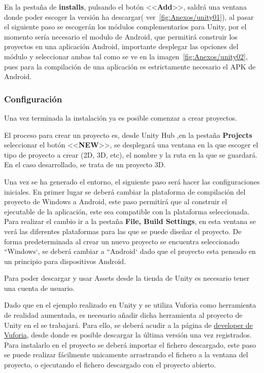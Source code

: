 En la pestaña de \textbf{installs}, pulsando el botón <<\textbf{Add}>>, saldrá una ventana donde poder escoger la versión ha descargar( ver~\ref{fig:Anexos/unity01}), al pasar el siguiente paso se escogerán los módulos complementarios para Unity, por el momento sería necesario el modulo de Android, que permitirá construir los proyectos en una aplicación Android, importante desplegar las opciones del módulo y seleccionar ambas tal como se ve en la imagen~\ref{fig:Anexos/unity02}, pues para la compilación de una aplicación es estrictamente necesario el APK de Android.



\label{sub:Confi}\subsubsection{Configuración }

Una vez terminada la instalación ya es posible comenzar a crear proyectos. 

El proceso para crear un proyecto es, desde Unity Hub ,en la pestaña \textbf{Projects} seleccionar el botón <<\textbf{NEW}>>, se desplegará una ventana en la que escoger el tipo de proyecto a crear (2D, 3D, etc), el nombre y la ruta en la que se guardará. En el caso desarrollado, se trata de un proyecto 3D.

Una vez se ha generado el entorno, el siguiente paso será hacer las configuraciones iniciales. En primer lugar se deberá cambiar la plataforma de compilación del proyecto de Windows a Android, este paso permitirá que al construir el ejecutable de la aplicación, este sea compatible con la plataforma seleccionada. 
Para realizar el cambio ir a la pestaña \textbf{File, Build Settings}, en esta ventana se verá las diferentes plataformas para las que se puede diseñar el proyecto. De forma predeterminada al crear un nuevo proyecto se encuentra seleccionado ``Windows`, se deberá cambiar a ``Android` dado que el proyecto esta pensado en un principio para dispositivos Android.

Para poder descargar y usar Assets desde la tienda de Unity es necesario tener una cuenta de usuario.

Dado que en el ejemplo realizado en Unity y se utiliza Vuforia como herramienta de realidad aumentada, es necesario añadir dicha herramienta al proyecto de Unity en el se trabajará. Para ello, se deberá acudir a la página de \href{https://developer.vuforia.com/downloads/sdk}{developer de Vuforia}, desde donde es posible descargar la última versión una vez registrados. Para instalarlo en el proyecto se deberá importar el fichero descargado, este paso se puede realizar fácilmente unicamente arrastrando el fichero a la ventana del proyecto, o ejecutando el fichero descargado con el proyecto abierto.

